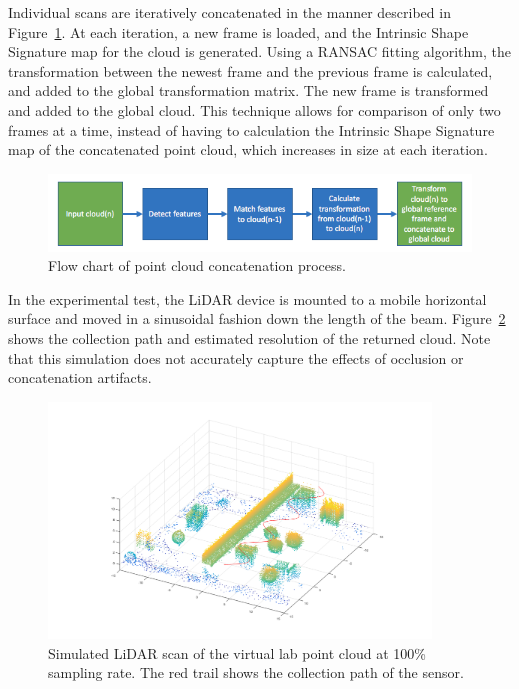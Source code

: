 \documentclass[12pt]{drexelthesis}
\begin{document}
Individual scans are iteratively concatenated in the manner described in Figure~\ref{technical:lidarcompare}. At each iteration, a new frame is loaded, and the Intrinsic Shape Signature map for the cloud is generated. Using a RANSAC fitting algorithm, the transformation between the newest frame and the previous frame is calculated, and added to the global transformation matrix. The new frame is transformed and added to the global cloud. This technique allows for comparison of only two frames at a time, instead of having to calculation the Intrinsic Shape Signature map of the concatenated point cloud, which increases in size at each iteration.

\begin{figure}[!ht]
	\centering
		\includegraphics[width=6in]{cloudCollection/cloud_concatenation.png}
		\caption[Flow chart of point cloud concatenation process.]{\centering Flow chart of point cloud concatenation process.}
	\label{technical:lidarcompare}
\end{figure}

In the experimental test, the LiDAR device is mounted to a mobile horizontal surface and moved in a sinusoidal fashion down the length of the beam. Figure~\ref{lidarsim:100psample} shows the collection path and estimated resolution of the returned cloud. Note that this simulation does not accurately capture the effects of occlusion or concatenation artifacts.

\begin{figure}[!ht]
	\centering
	\includegraphics[width=4in]{simulated-lab-scan/lidarSim/100psample.png}
	\caption[Simulated LiDAR scan at 100\% sampling rate]{\centering Simulated LiDAR scan of the virtual lab point cloud at 100\% sampling rate. The red trail shows the collection path of the sensor.}
	\label{lidarsim:100psample}
\end{figure}
\end{document}
